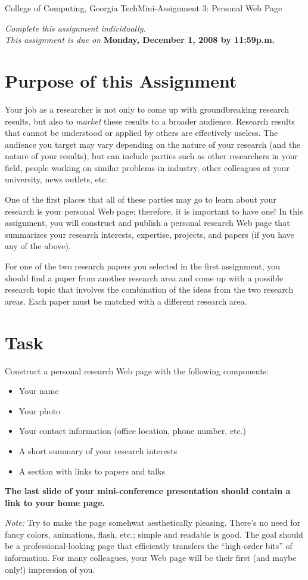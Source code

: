 \documentclass[11pt]{article}
\begin{document}


{College of Computing, Georgia Tech}{Mini-Assignment 3: Personal Web Page}

{\em Complete this assignment individually. \\  This
  assignment is due on} {\bf Monday, December 1, 2008 by 11:59p.m.}

\section{Purpose of this Assignment}


Your job as a researcher is not only to come up with groundbreaking
research results, but also to {\em market} these results to a broader
audience.  Research results that cannot be understood or applied by
others are effectively useless.  The audience you target may vary
depending on the nature of your research (and the nature of your
results), but can include parties such as other researchers in your
field, people working on similar problems in industry, other colleagues
at your university, news outlets, etc.

One of the first places that all of these parties may go to learn about
your research is your personal Web page; therefore, it is important to
have one!  In this assignment, you will construct and publish a personal
research Web page that summarizes your research interests, expertise,
projects, and papers (if you have any of the above). 



For one of the two research papers you selected in the first
assignment, you should find a paper from another research area and come
up with a possible research topic that involves the combination of the
ideas from the two research areas.  Each paper must be matched with a
different research area.


\section{Task}


Construct a personal research Web page with the following components:
\begin{itemize}
\item Your name
\item Your photo
\item Your contact information (office location, phone number, etc.)
\item A short summary of your research interests
\item A section with links to papers and talks
\end{itemize}

{\bf The last slide of your mini-conference presentation should contain
  a link to your home page.}

\noindent
{\em Note:} Try to make the page somehwat aesthetically pleasing.
There's no need for fancy colors, animations, flash, etc.; simple and
readable is good.  The goal should be a professional-looking page that
efficiently transfers the ``high-order bits'' of information.  For many
colleagues, your Web page will be their first (and maybe only!)
impression of you.
\end{document}
